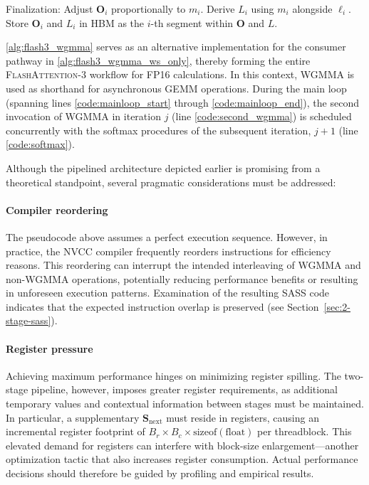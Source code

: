 \begin{enumerate}
\begin{algorithm}[H]
\begin{algorithmic}[1]
\STATE Finalization: Adjust $\mathbf{O}_{i}$ proportionally to $m_{i}$. Derive $L_{i}$ using $m_{i}$ alongside $\ell_{i}$.
    Store $\mathbf{O}_{i}$ and $L_{i}$ in HBM as the $i$-th segment within $\mathbf{O}$ and $L$.
  \end{algorithmic}
\end{algorithm}

\cref{alg:flash3_wgmma} serves as an alternative implementation for the consumer pathway in \cref{alg:flash3_wgmma_ws_only}, thereby forming the entire \textsc{FlashAttention-3} workflow for FP16 calculations. In this context, WGMMA is used as shorthand for asynchronous GEMM operations. During the main loop (spanning lines \ref{code:mainloop_start} through \ref{code:mainloop_end}), the second invocation of WGMMA in iteration $j$ (line \ref{code:second_wgmma}) is scheduled concurrently with the softmax procedures of the subsequent iteration, $j+1$ (line \ref{code:softmax}).

Although the pipelined architecture depicted earlier is promising from a theoretical standpoint, several pragmatic considerations must be addressed:

\paragraph{Compiler reordering} The pseudocode above assumes a perfect execution sequence. However, in practice, the NVCC compiler frequently reorders instructions for efficiency reasons. This reordering can interrupt the intended interleaving of WGMMA and non-WGMMA operations, potentially reducing performance benefits or resulting in unforeseen execution patterns. Examination of the resulting SASS code indicates that the expected instruction overlap is preserved (see Section~\ref{sec:2-stage-sass}).

\paragraph{Register pressure} Achieving maximum performance hinges on minimizing register spilling. The two-stage pipeline, however, imposes greater register requirements, as additional temporary values and contextual information between stages must be maintained. In particular, a supplementary $\mathbf{S}_{\mathrm{next}}$ must reside in registers, causing an incremental register footprint of $B_r \times B_c \times \text{sizeof}(\text{float})$ per threadblock. This elevated demand for registers can interfere with block-size enlargement—another optimization tactic that also increases register consumption. Actual performance decisions should therefore be guided by profiling and empirical results.


\end{enumerate}

